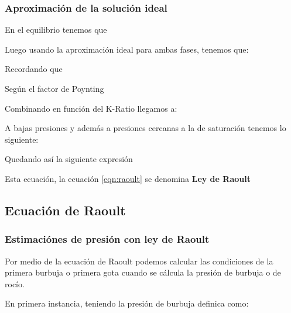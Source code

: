 \subsubsection{Aproximación de la solución ideal}

En el equilibrio tenemos que


Luego usando la aproximación ideal para ambas fases, tenemos que:


Recordando que


Según el factor de Poynting


Combinando en función del K-Ratio llegamos a:

A bajas presiones y además a presiones cercanas a la de saturación tenemos lo siguiente:


Quedando así la siguiente expresión


Esta ecuación, la ecuación \ref{eqn:raoult} se denomina \textbf{Ley de Raoult}

\subsection{Ecuación de Raoult}
\subsubsection{Estimaciónes de presión con ley de Raoult}
Por medio de la ecuación de Raoult podemos calcular las condiciones de la primera burbuja o primera gota cuando se cálcula la presión de burbuja o de rocío.

En primera instancia, teniendo la presión de burbuja definica como:



